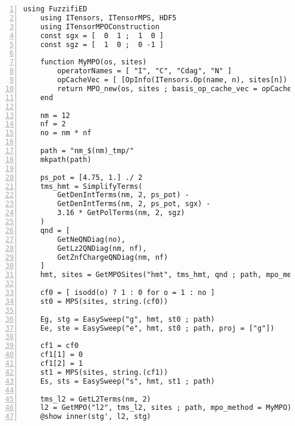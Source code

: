 \documentclass{timesjhep}
\begin{document}
\begin{lstlisting}[numbers=left]
    using FuzzifiED
    using ITensors, ITensorMPS, HDF5
    using ITensorMPOConstruction
    const sgx = [  0  1 ;  1  0 ]
    const sgz = [  1  0 ;  0 -1 ]

    function MyMPO(os, sites)
        operatorNames = [ "I", "C", "Cdag", "N" ]
        opCacheVec = [ [OpInfo(ITensors.Op(name, n), sites[n]) for name in operatorNames] for n in eachindex(sites)  ]
        return MPO_new(os, sites ; basis_op_cache_vec = opCacheVec)
    end

    nm = 12
    nf = 2
    no = nm * nf

    path = "nm_$(nm)_tmp/"
    mkpath(path)

    ps_pot = [4.75, 1.] ./ 2
    tms_hmt = SimplifyTerms(
        GetDenIntTerms(nm, 2, ps_pot) - 
        GetDenIntTerms(nm, 2, ps_pot, sgx) - 
        3.16 * GetPolTerms(nm, 2, sgz)
    )
    qnd = [ 
        GetNeQNDiag(no), 
        GetLz2QNDiag(nm, nf), 
        GetZnfChargeQNDiag(nm, nf) 
    ]
    hmt, sites = GetMPOSites("hmt", tms_hmt, qnd ; path, mpo_method = MyMPO)

    cf0 = [ isodd(o) ? 1 : 0 for o = 1 : no ]
    st0 = MPS(sites, string.(cf0))

    Eg, stg = EasySweep("g", hmt, st0 ; path)
    Ee, ste = EasySweep("e", hmt, st0 ; path, proj = ["g"])

    cf1 = cf0
    cf1[1] = 0
    cf1[2] = 1
    st1 = MPS(sites, string.(cf1))
    Es, sts = EasySweep("s", hmt, st1 ; path)

    tms_l2 = GetL2Terms(nm, 2)
    l2 = GetMPO("l2", tms_l2, sites ; path, mpo_method = MyMPO)
    @show inner(stg', l2, stg)
\end{lstlisting}



\end{document}

